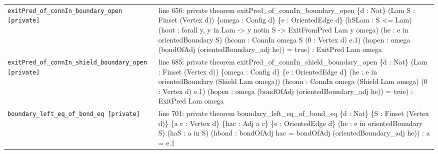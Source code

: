 \documentclass[10pt]{article}
\begin{document}
\begin{longtable}{>{\raggedright\arraybackslash}p{} >{\raggedright\arraybackslash}p{}}
\texttt{exitPred\_\allowbreak{}of\_\allowbreak{}connIn\_\allowbreak{}boundary\_\allowbreak{}open [private]} & {\ttfamily\scriptsize line 656:\allowbreak{} private theorem exitPred\_\allowbreak{}of\_\allowbreak{}connIn\_\allowbreak{}boundary\_\allowbreak{}open \{d :\allowbreak{} Nat\} (\allowbreak{}Lam S :\allowbreak{} Finset (\allowbreak{}Vertex d)\allowbreak{})\allowbreak{} \{omega :\allowbreak{} Config d\} \{e :\allowbreak{} OrientedEdge d\} (\allowbreak{}hSLam :\allowbreak{} S <=\allowbreak{} Lam)\allowbreak{} (\allowbreak{}hout :\allowbreak{} forall y,\allowbreak{} y in Lam -\allowbreak{}> y notin S -\allowbreak{}> ExitFromPred Lam y omega)\allowbreak{} (\allowbreak{}he :\allowbreak{} e in orientedBoundary S)\allowbreak{} (\allowbreak{}hconn :\allowbreak{} ConnIn omega S (\allowbreak{}0 :\allowbreak{} Vertex d)\allowbreak{} e.\allowbreak{}1)\allowbreak{} (\allowbreak{}hopen :\allowbreak{} omega (\allowbreak{}bondOfAdj (\allowbreak{}orientedBoundary\_\allowbreak{}adj he)\allowbreak{})\allowbreak{} =\allowbreak{} true)\allowbreak{} :\allowbreak{} ExitPred Lam omega} \\[0.45em]
\texttt{exitPred\_\allowbreak{}of\_\allowbreak{}connIn\_\allowbreak{}shield\_\allowbreak{}boundary\_\allowbreak{}open [private]} & {\ttfamily\scriptsize line 685:\allowbreak{} private theorem exitPred\_\allowbreak{}of\_\allowbreak{}connIn\_\allowbreak{}shield\_\allowbreak{}boundary\_\allowbreak{}open \{d :\allowbreak{} Nat\} (\allowbreak{}Lam :\allowbreak{} Finset (\allowbreak{}Vertex d)\allowbreak{})\allowbreak{} \{omega :\allowbreak{} Config d\} \{e :\allowbreak{} OrientedEdge d\} (\allowbreak{}he :\allowbreak{} e in orientedBoundary (\allowbreak{}Shield Lam omega)\allowbreak{})\allowbreak{} (\allowbreak{}hconn :\allowbreak{} ConnIn omega (\allowbreak{}Shield Lam omega)\allowbreak{} (\allowbreak{}0 :\allowbreak{} Vertex d)\allowbreak{} e.\allowbreak{}1)\allowbreak{} (\allowbreak{}hopen :\allowbreak{} omega (\allowbreak{}bondOfAdj (\allowbreak{}orientedBoundary\_\allowbreak{}adj he)\allowbreak{})\allowbreak{} =\allowbreak{} true)\allowbreak{} :\allowbreak{} ExitPred Lam omega} \\[0.45em]
\texttt{boundary\_\allowbreak{}left\_\allowbreak{}eq\_\allowbreak{}of\_\allowbreak{}bond\_\allowbreak{}eq [private]} & {\ttfamily\scriptsize line 701:\allowbreak{} private theorem boundary\_\allowbreak{}left\_\allowbreak{}eq\_\allowbreak{}of\_\allowbreak{}bond\_\allowbreak{}eq \{d :\allowbreak{} Nat\} \{S :\allowbreak{} Finset (\allowbreak{}Vertex d)\allowbreak{}\} \{a c :\allowbreak{} Vertex d\} \{hac :\allowbreak{} Adj a c\} \{e :\allowbreak{} OrientedEdge d\} (\allowbreak{}he :\allowbreak{} e in orientedBoundary S)\allowbreak{} (\allowbreak{}haS :\allowbreak{} a in S)\allowbreak{} (\allowbreak{}hbond :\allowbreak{} bondOfAdj hac =\allowbreak{} bondOfAdj (\allowbreak{}orientedBoundary\_\allowbreak{}adj he)\allowbreak{})\allowbreak{} :\allowbreak{} a =\allowbreak{} e.\allowbreak{}1} \\[0.45em]

\end{longtable}
\end{document}
